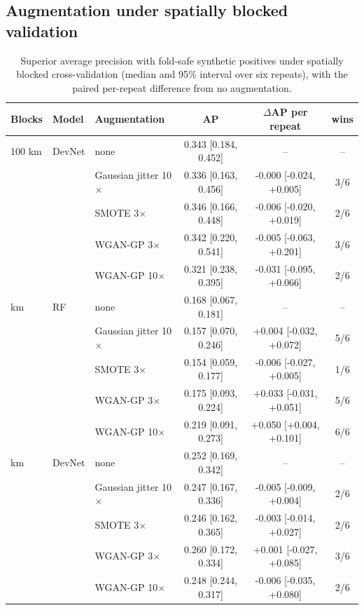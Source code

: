\documentclass[pdflatex,sn-apa]{sn-jnl}
\begin{document}
\begin{appendices}
\clearpage
\section{Augmentation under spatially blocked validation}\label{app:aug-spatial}

\begin{table}[!h]
\caption{Superior average precision with fold-safe synthetic positives under spatially blocked cross-validation (median and 95\% interval over six repeats), with the paired per-repeat difference from no augmentation.}\label{tab:aug-spatial}
\footnotesize
\begin{tabular*}{\textwidth}{@{\extracolsep\fill}lllccc}
\toprule
Blocks & Model & Augmentation & AP & $\Delta$AP per repeat & wins \\
\midrule
100 km & DevNet & none & 0.343 [0.184, 0.452] & -- & -- \\
 &  & Gaussian jitter 10$\times$ & 0.336 [0.163, 0.456] & -0.000 [-0.024, +0.005] & 3/6 \\
 &  & SMOTE 3$\times$ & 0.346 [0.166, 0.448] & -0.006 [-0.020, +0.019] & 2/6 \\
 &  & WGAN-GP 3$\times$ & 0.342 [0.220, 0.541] & -0.005 [-0.063, +0.201] & 3/6 \\
 &  & WGAN-GP 10$\times$ & 0.321 [0.238, 0.395] & -0.031 [-0.095, +0.066] & 2/6 \\
\addlinespace
100 km & RF & none & 0.168 [0.067, 0.181] & -- & -- \\
 &  & Gaussian jitter 10$\times$ & 0.157 [0.070, 0.246] & +0.004 [-0.032, +0.072] & 5/6 \\
 &  & SMOTE 3$\times$ & 0.154 [0.059, 0.177] & -0.006 [-0.027, +0.005] & 1/6 \\
 &  & WGAN-GP 3$\times$ & 0.175 [0.093, 0.224] & +0.033 [-0.031, +0.051] & 5/6 \\
 &  & WGAN-GP 10$\times$ & 0.219 [0.091, 0.273] & +0.050 [+0.004, +0.101] & 6/6 \\
\addlinespace
200 km & DevNet & none & 0.252 [0.169, 0.342] & -- & -- \\
 &  & Gaussian jitter 10$\times$ & 0.247 [0.167, 0.336] & -0.005 [-0.009, +0.004] & 2/6 \\
 &  & SMOTE 3$\times$ & 0.246 [0.162, 0.365] & -0.003 [-0.014, +0.027] & 2/6 \\
 &  & WGAN-GP 3$\times$ & 0.260 [0.172, 0.334] & +0.001 [-0.027, +0.085] & 3/6 \\
 &  & WGAN-GP 10$\times$ & 0.248 [0.244, 0.317] & -0.006 [-0.035, +0.080] & 2/6 \\

\end{tabular*}
\end{table}
\end{appendices}
\end{document}
